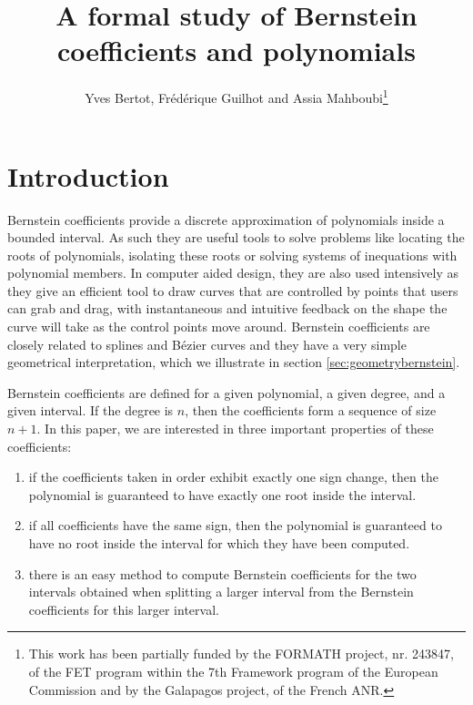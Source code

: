 \documentclass{mscs}
\begin{document}
\title{A formal study of Bernstein coefficients and polynomials}
\author[Y. Bertot, F. Guilhot and A. Mahboubi]{Yves Bertot,
  Fr\'ed\'erique Guilhot and Assia
  Mahboubi\thanks{This work has been partially funded by the FORMATH
    project, nr. 243847, of the FET program within the 7th Framework
    program of the European Commission and by the Galapagos project, of the
    French ANR.
}}


\newtheorem{lemma}{Lemma}[section]
\newtheorem{definition}{Definition}[section]
\newtheorem{theorem}{Theorem}[section]

\maketitle

\section{Introduction}
Bernstein coefficients provide a discrete approximation of polynomials
inside a bounded interval. As such they are useful tools to solve
problems like locating the roots of polynomials, isolating these roots
or solving systems of inequations with polynomial members.  In
computer aided design, they are also used intensively as they give an
efficient tool to draw curves that are controlled by points that users
can grab and drag, with instantaneous and intuitive feedback on the
shape the curve will take as the control points move around.
Bernstein coefficients are closely related to splines and B\'ezier curves
and they have a very simple geometrical interpretation, which we illustrate
in section \ref{sec:geometrybernstein}.

Bernstein coefficients are defined for a given polynomial, a given
degree, and a given interval. If the degree is \(n\), then
the coefficients form a sequence of size \(n+1\). In
this paper, we are interested in three important properties of these
coefficients:
\begin{enumerate}
\item if the coefficients taken in order exhibit exactly one sign change,
  then the polynomial is guaranteed to have exactly one root inside
  the interval.
\item  if all coefficients have the same sign, then the
  polynomial is guaranteed to have no root inside the interval
  for which they have been computed.
\item there is an easy method to compute Bernstein coefficients for
  the two intervals obtained when splitting a larger interval from the
  Bernstein coefficients for this larger interval.
\end{enumerate}
\end{document}
